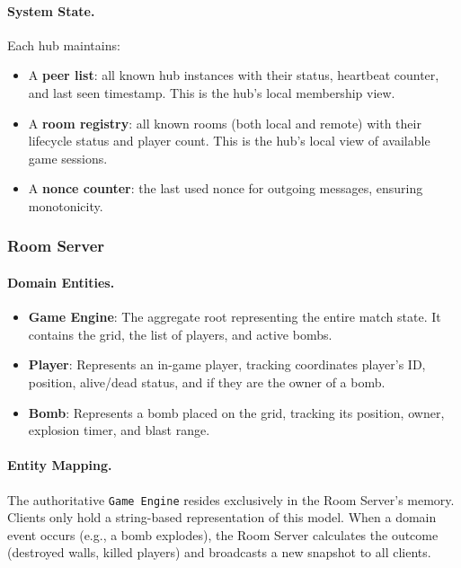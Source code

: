 \paragraph{System State.}

Each hub maintains:
\begin{itemize}
  \item A \textbf{peer list}: all known hub instances with their status, heartbeat counter, and last seen timestamp. This is the hub's local membership view.
  \item A \textbf{room registry}: all known rooms (both local and remote) with their lifecycle status and player count. This is the hub's local view of available game sessions.
  \item A \textbf{nonce counter}: the last used nonce for outgoing messages, ensuring monotonicity.
\end{itemize}

\subsubsection{Room Server}

\paragraph{Domain Entities.}
\begin{itemize}
  \item \textbf{Game Engine}: The aggregate root representing the entire match state. 
  It contains the grid, the list of players, and active bombs.
  \item \textbf{Player}: Represents an in-game player, tracking coordinates player's ID, position, alive/dead status, and if they are the owner of a bomb.
  \item \textbf{Bomb}: Represents a bomb placed on the grid, tracking its position, owner, explosion timer, and blast range.
\end{itemize}

\paragraph{Entity Mapping.}
The authoritative \texttt{Game Engine} resides exclusively in the Room Server's memory. 
Clients only hold a string-based representation of this model. 
When a domain event occurs (e.g., a bomb explodes), the Room Server calculates the outcome (destroyed walls, killed players) and broadcasts a new snapshot to all clients.


